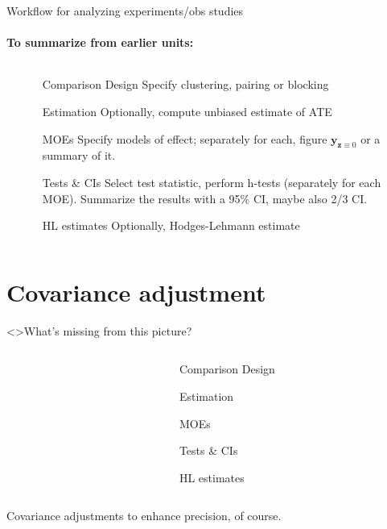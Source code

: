 \begin{frame}{Workflow for analyzing experiments/obs studies}
  \framesubtitle{To summarize from earlier units:}

  \begin{columns}
    \begin{column}{.25\linewidth}
      
    \end{column}
    \begin{column}{.75\linewidth}
        \begin{itemize}
  \item[Comparison Design] Specify clustering, pairing or blocking
  \item[Estimation] Optionally, compute unbiased estimate of ATE
  \item[MOEs] Specify models of effect; separately for each, figure $\mathbf{y}_{\mathbf{z}\equiv 0} $ or a summary of it.
  \item[Tests \& CIs] Select test statistic, perform h-tests (separately for each MOE). Summarize the results with a 95\% CI, maybe also 2/3 CI. 
  \item[HL estimates] Optionally, Hodges-Lehmann estimate
  \end{itemize}

    \end{column}
  \end{columns}
\end{frame}
\section{Covariance adjustment}
\begin{frame}<\nottheirhandout>{What's missing from this picture?}


  \begin{columns}
    \begin{column}{.25\linewidth}
      
    \end{column}
    \begin{column}{.75\linewidth}
        \begin{itemize}
  \item[Comparison Design] 
  \item[Estimation] 
  \item[MOEs] 
  \item[Tests \& CIs] 
  \item[HL estimates] 
  \end{itemize}

    \end{column}
  \end{columns}
\pause

\vfill
Covariance adjustments to enhance precision, of course.
  
\end{frame}

